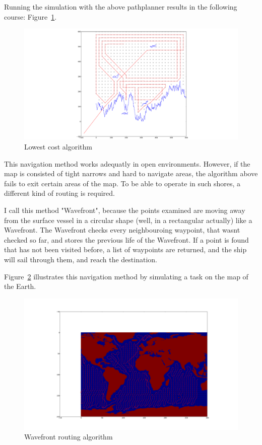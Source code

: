 Running the simulation with the above pathplanner results in the following course: Figure~\ref{fig:lc}.

\begin{figure}[H]
	\centering
	\includegraphics[width=\textwidth]{img/geee}
	\caption{Lowest cost algorithm}
	\label{fig:lc}
\end{figure}

This navigation method works adequatly in open environments. However, if the map is consisted of tight narrows and hard to navigate areas, the algorithm above fails to exit certain areas of the map. To be able to operate in such shores, a different kind of routing is required.

I call this method "Wavefront", because the points examined are moving away from the surface vessel in a circular shape (well, in a rectangular actually) like a Wavefront. The Wavefront checks every neighbouroing waypoint, that wasnt checked so far, and stores the previous life of the Wavefront. If a point is found that has not been visited before, a list of waypoints are returned, and the ship will sail through them, and reach the destination.

Figure~\ref{fig:Wavefront} illustrates this navigation method by simulating a task on the map of the Earth.

\begin{figure}[H]
	\centering
	\includegraphics[width=\textwidth]{img/Wavefront}
	\caption{Wavefront routing algorithm}
	\label{fig:Wavefront}
\end{figure}

